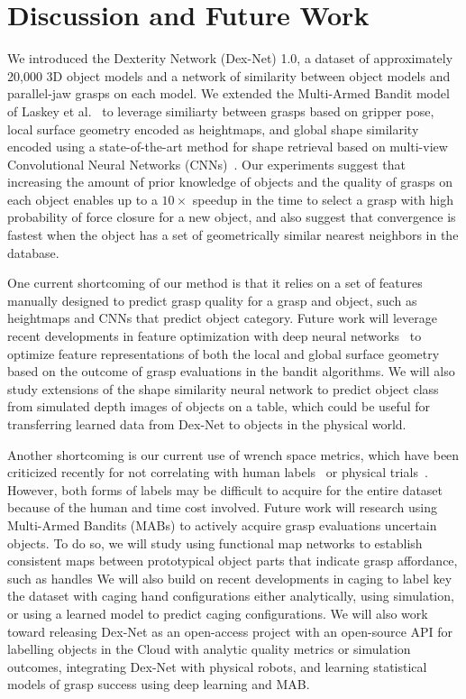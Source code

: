 \section{Discussion and Future Work}
We introduced the Dexterity Network (Dex-Net) 1.0, a dataset of approximately 20,000 3D object models and a network of similarity between object models and parallel-jaw grasps on each model.
We extended the Multi-Armed Bandit model of Laskey et al.~\cite{laskey2015bandits} to leverage similiarty between grasps based on gripper pose, local surface geometry encoded as heightmaps, and global shape similarity encoded using a state-of-the-art method for shape retrieval based on multi-view Convolutional Neural Networks (CNNs)~\cite{su2015multi}.
Our experiments suggest that increasing the amount of prior knowledge of objects and the quality of grasps on each object enables up to a $10\times$ speedup in the time to select a grasp with high probability of force closure for a new object, and also suggest that convergence is fastest when the object has a set of geometrically similar nearest neighbors in the database.

One current shortcoming of our method is that it relies on a set of features manually designed to predict grasp quality for a grasp and object, such as heightmaps and CNNs that predict object category.
Future work will leverage recent developments in feature optimization with deep neural networks~\cite{levine2015end} to optimize feature representations of both the local and global surface geometry based on the outcome of grasp evaluations in the bandit algorithms.
We will also study extensions of the shape similarity neural network to predict object class from simulated depth images of objects on a table, which could be useful for transferring learned data from Dex-Net to objects in the physical world.

Another shortcoming is our current use of wrench space metrics, which have been criticized recently for not correlating with human labels~\cite{kappler2015leveraging} or physical trials~\cite{balasubramanian2012physical}.
However, both forms of labels may be difficult to acquire for the entire dataset because of the human and time cost involved.
Future work will research using Multi-Armed Bandits (MABs) to actively acquire grasp evaluations uncertain objects.
To do so, we will study using functional map networks to establish consistent maps between prototypical object parts that indicate grasp affordance, such as handles
We will also build on recent developments in caging to label key the dataset with caging hand configurations either analytically, using simulation, or using a learned model to predict caging configurations.
We will also work toward releasing Dex-Net as an open-access project with an open-source API for labelling objects in the Cloud with analytic quality metrics or simulation outcomes, integrating Dex-Net with physical robots, and learning statistical models of grasp success using deep learning and MAB.

